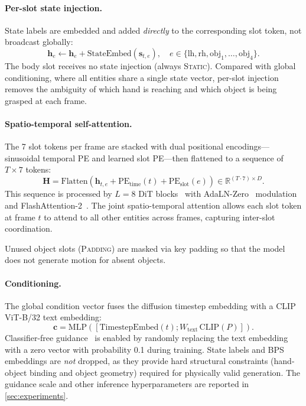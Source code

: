 \documentclass[sigconf, screen, review, anonymous]{acmart}
\begin{document}
\paragraph{Per-slot state injection.}
State labels are embedded and added \emph{directly} to the corresponding slot token, not broadcast globally:
\begin{equation}
    \mathbf{h}_e \leftarrow \mathbf{h}_e + \text{StateEmbed}(\mathbf{s}_{t,e}), \quad e \in \{\text{lh}, \text{rh}, \text{obj}_1, \ldots, \text{obj}_4\}.
    \label{eq:state_inject}
\end{equation}
The body slot receives no state injection (always \textsc{Static}). Compared with global conditioning, where all entities share a single state vector, per-slot injection removes the ambiguity of which hand is reaching and which object is being grasped at each frame.

\paragraph{Spatio-temporal self-attention.}
The 7 slot tokens per frame are stacked with dual positional encodings---sinusoidal temporal PE and learned slot PE---then flattened to a sequence of $T \times 7$ tokens:
\begin{equation}
    \mathbf{H} = \text{Flatten}\left(\mathbf{h}_{t,e} + \text{PE}_{\text{time}}(t) + \text{PE}_{\text{slot}}(e)\right) \in \mathbb{R}^{(T \cdot 7) \times D}.
    \label{eq:flatten}
\end{equation}
This sequence is processed by $L{=}8$ DiT blocks~\cite{peebles2023scalable} with AdaLN-Zero~\cite{peebles2023scalable} modulation and FlashAttention-2~\cite{dao2023flashattention2}. The joint spatio-temporal attention allows each slot token at frame $t$ to attend to all other entities across frames, capturing inter-slot coordination.

Unused object slots (\textsc{Padding}) are masked via key padding so that the model does not generate motion for absent objects.

\paragraph{Conditioning.}
The global condition vector fuses the diffusion timestep embedding with a CLIP~\cite{radford2021learning} ViT-B/32 text embedding:
\begin{equation}
    \mathbf{c} = \text{MLP}([\text{TimestepEmbed}(t); W_{\text{text}}\,\text{CLIP}(P)]).
    \label{eq:condition}
\end{equation}
Classifier-free guidance~\cite{ho2022classifier} is enabled by randomly replacing the text embedding with a zero vector with probability 0.1 during training. State labels and BPS embeddings are \emph{not} dropped, as they provide hard structural constraints (hand-object binding and object geometry) required for physically valid generation. The guidance scale and other inference hyperparameters are reported in \cref{sec:experiments}.
\end{document}

